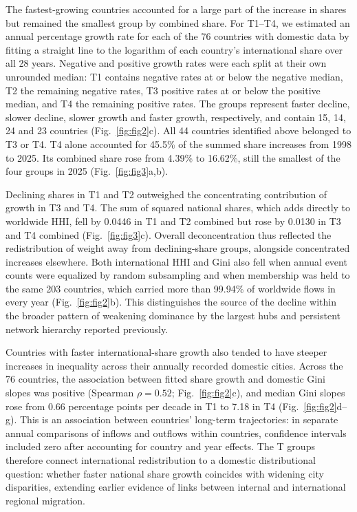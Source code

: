 The fastest-growing countries accounted for a large part of the increase in shares but remained the smallest group by combined share. For T1--T4, we estimated an annual percentage growth rate for each of the 76 countries with domestic data by fitting a straight line to the logarithm of each country's international share over all 28 years. Negative and positive growth rates were each split at their own unrounded median: T1 contains negative rates at or below the negative median, T2 the remaining negative rates, T3 positive rates at or below the positive median, and T4 the remaining positive rates. The groups represent faster decline, slower decline, slower growth and faster growth, respectively, and contain 15, 14, 24 and 23 countries (Fig.~\ref{fig:fig2}c). All 44 countries identified above belonged to T3 or T4. T4 alone accounted for 45.5\% of the summed share increases from 1998 to 2025. Its combined share rose from 4.39\% to 16.62\%, still the smallest of the four groups in 2025 (Fig.~\ref{fig:fig3}a,b).

Declining shares in T1 and T2 outweighed the concentrating contribution of growth in T3 and T4. The sum of squared national shares, which adds directly to worldwide HHI, fell by 0.0446 in T1 and T2 combined but rose by 0.0130 in T3 and T4 combined (Fig.~\ref{fig:fig3}c). Overall deconcentration thus reflected the redistribution of weight away from declining-share groups, alongside concentrated increases elsewhere. Both international HHI and Gini also fell when annual event counts were equalized by random subsampling and when membership was held to the same 203 countries, which carried more than 99.94\% of worldwide flows in every year (Fig.~\ref{fig:fig2}b). This distinguishes the source of the decline within the broader pattern of weakening dominance by the largest hubs and persistent network hierarchy reported previously\cite{yenilmez2026}.

Countries with faster international-share growth also tended to have steeper increases in inequality across their annually recorded domestic cities. Across the 76 countries, the association between fitted share growth and domestic Gini slopes was positive (Spearman $\rho=0.52$; Fig.~\ref{fig:fig2}c), and median Gini slopes rose from 0.66 percentage points per decade in T1 to 7.18 in T4 (Fig.~\ref{fig:fig2}d--g). This is an association between countries' long-term trajectories: in separate annual comparisons of inflows and outflows within countries, confidence intervals included zero after accounting for country and year effects. The T groups therefore connect international redistribution to a domestic distributional question: whether faster national share growth coincides with widening city disparities, extending earlier evidence of links between internal and international regional migration\cite{ref029}.


